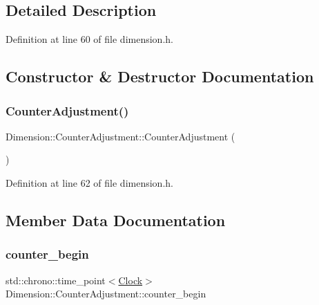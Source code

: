 \subsection{Detailed Description}


Definition at line 60 of file dimension.\+h.



\subsection{Constructor \& Destructor Documentation}
\mbox{\label{struct_dimension_1_1_counter_adjustment_acc176dbec1decf3ae2276f191c78d9c0}} 
\subsubsection{\texorpdfstring{Counter\+Adjustment()}{CounterAdjustment()}}
{\footnotesize\ttfamily Dimension\+::\+Counter\+Adjustment\+::\+Counter\+Adjustment (\begin{DoxyParamCaption}{ }\end{DoxyParamCaption})\hspace{0.3cm}{\ttfamily [inline]}}



Definition at line 62 of file dimension.\+h.



\subsection{Member Data Documentation}
\mbox{\label{struct_dimension_1_1_counter_adjustment_a479e5fe39e4f030d8c8ed49efaf3c9c5}} 
\subsubsection{\texorpdfstring{counter\+\_\+begin}{counter\_begin}}
{\footnotesize\ttfamily std\+::chrono\+::time\+\_\+point$<$\mbox{\hyperlink{universe_8h_a0ef8d951d1ca5ab3cfaf7ab4c7a6fd80}{Clock}}$>$ Dimension\+::\+Counter\+Adjustment\+::counter\+\_\+begin}



